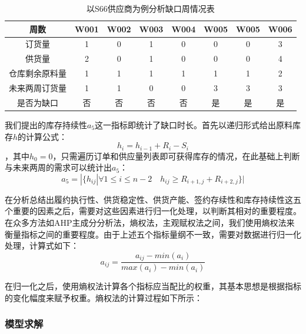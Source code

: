 \documentclass{my_paper}
\begin{document}
\begin{enumerate}
\begin{table}[ht]
    \centering
    \caption{以S66供应商为例分析缺口周情况表}
    \begin{tabular}{c|ccccccc}
    \toprule
    周数      & W001 & W002 & W003 & W004 & W005 & W005 & W006 \\\midrule
订货量     & 1    & 0    & 1    & 0    & 0    & 0    & 3    \\
供货量     & 2    & 0    & 1    & 0    & 0    & 0    & 4    \\
仓库剩余原料量 & 1    & 1    & 1    & 1    & 1    & 1    & 2    \\
未来两周订货量 & 1    & 1    & 0    & 0    & 3    & 3    & 3    \\
是否为缺口   & 否    & 否    & 否    & 否    & 是    & 是    & 是\\
    \bottomrule
      \end{tabular}
    
    \label{label}
      \end{table}
    
    我们提出的库存持续性$a_5$这一指标即统计了缺口时长。首先以递归形式给出原料库存$h$的计算公式：
    \begin{equation}
    h_i=h_{i-1}+R_i-S_i
    \label{hi}
    \end{equation}
    ，其中$h_0=0$，只需遍历订单和供应量列表即可获得库存的情况，在此基础上判断与未来两周的需求可以统计出$a_5$：
    \begin{equation}
    a_5 = |\{ h_{ij} |\forall 1\leq i \leq n-2 \quad h_{ij}\geq R_{i+1,j}+R_{i+2,j}\}|
    \label{aj5}
    \end{equation}
    
\end{enumerate}

在分析总结出履约执行性、供货稳定性、供货产能、签约存续性和库存持续性这五个重要的因素之后，需要对这些因素进行归一化处理，以判断其相对的重要程度。在众多方法如AHP主成分分析法\cite{2}，熵权法\cite{3}，主观赋权法之间，我们使用熵权法来衡量指标之间的重要程度。由于上述五个指标量纲不一致，需要对数据进行归一化处理，计算式如下：
\begin{equation}
a_{ij}=\frac{a_{ij}-min(a_i)}{max(a_i)-min(a_i)}
\label{aij}
\end{equation}

在归一化之后，使用熵权法计算各个指标应当配比的权重，其基本思想是根据指标的变化幅度来赋予权重。熵权法的计算过程如下所示：

\subsubsection{模型求解}
\end{document}
